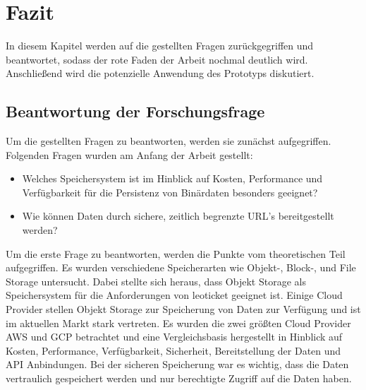 \chapter{Fazit}

In diesem Kapitel werden auf die gestellten Fragen zurückgegriffen und beantwortet, sodass der rote Faden der Arbeit nochmal deutlich wird. Anschließend wird die potenzielle Anwendung des Prototyps diskutiert.

\section{Beantwortung der Forschungsfrage}

Um die gestellten Fragen zu beantworten, werden sie zunächst aufgegriffen. Folgenden Fragen wurden am Anfang der Arbeit gestellt:

\begin{itemize}
	\item Welches Speichersystem ist im Hinblick auf Kosten, Performance und Verfügbarkeit für die Persistenz von Binärdaten besonders geeignet? 
	\item Wie können Daten durch sichere, zeitlich begrenzte URL's bereitgestellt werden?
\end{itemize}

Um die erste Frage zu beantworten, werden die Punkte vom theoretischen Teil aufgegriffen. Es wurden verschiedene Speicherarten wie Objekt-, Block-, und File Storage untersucht. Dabei stellte sich heraus, dass Objekt Storage als Speichersystem für die Anforderungen von leoticket geeignet ist. Einige Cloud Provider stellen Objekt Storage zur Speicherung von Daten zur Verfügung und ist im aktuellen Markt stark vertreten. Es wurden die zwei größten Cloud Provider AWS und GCP betrachtet und eine Vergleichsbasis hergestellt in Hinblick auf Kosten, Performance, Verfügbarkeit, Sicherheit, Bereitstellung der Daten und API Anbindungen. Bei der sicheren Speicherung war es wichtig, dass die Daten vertraulich gespeichert werden und nur berechtigte Zugriff auf die Daten haben.\\

